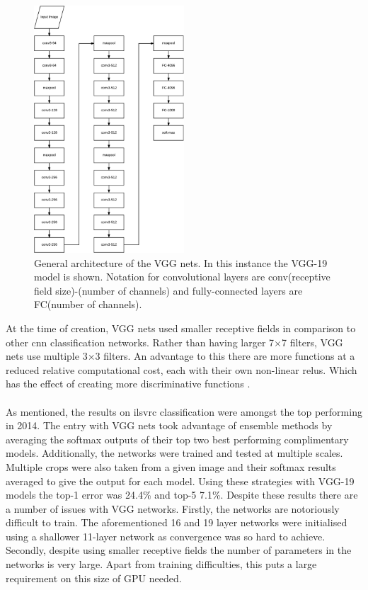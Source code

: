 \begin{figure}[H]
  \centering
    \includegraphics[width=0.5\textwidth]{Figs/Techanal/vggarch.pdf}
    \caption{General architecture of the VGG nets. In this instance the VGG-19 model is shown. Notation for convolutional layers are conv(receptive field size)-(number of channels) and fully-connected layers are FC(number of channels).}
    \label{fig:vggarch}
\end{figure}

At the time of creation, VGG nets used smaller receptive fields in comparison to other \gls{cnn} classification networks. Rather than having larger 7$\times$7 filters, VGG nets use multiple 3$\times$3 filters. An advantage to this there are more functions at a reduced relative computational cost, each with their own non-linear \glspl{relu}. Which has the effect of creating more discriminative functions \cite{vgg16}.
\\\\
As mentioned, the results on \gls{ilsvrc} classification were amongst the top performing in 2014. The entry with VGG nets took advantage of ensemble methods by averaging the softmax outputs of their top two best performing complimentary models. Additionally, the networks were trained and tested at multiple scales. Multiple crops were also taken from a given image and their softmax results averaged to give the output for each model. Using these strategies with VGG-19 models the top-1 error was 24.4\% and top-5 7.1\%. Despite these results there are a number of issues with VGG networks. Firstly, the networks are notoriously difficult to train. The aforementioned 16 and 19 layer networks were initialised using a shallower 11-layer network as convergence was so hard to achieve. Secondly, despite using smaller receptive fields the number of parameters in the networks is very large. Apart from training difficulties, this puts a large requirement on this size of GPU needed. 


